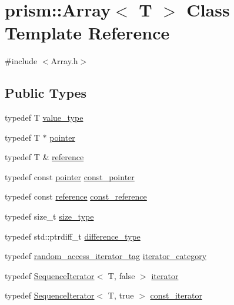 \hypertarget{classprism_1_1_array}{}\section{prism\+:\+:Array$<$ T $>$ Class Template Reference}
\label{classprism_1_1_array}


{\ttfamily \#include $<$Array.\+h$>$}

\subsection*{Public Types}
\begin{DoxyCompactItemize}
\item 
typedef T \hyperlink{classprism_1_1_array_a7b6dc8358fdfe216f4477a361190c9af}{value\+\_\+type}
\item 
typedef T $\ast$ \hyperlink{classprism_1_1_array_a391b8bb39ab945786ca33a0110fc163c}{pointer}
\item 
typedef T \& \hyperlink{classprism_1_1_array_a1ebfd26a4f219fcb24eb7f068704d9aa}{reference}
\item 
typedef const \hyperlink{classprism_1_1_array_a391b8bb39ab945786ca33a0110fc163c}{pointer} \hyperlink{classprism_1_1_array_a42db67aa315835ceb28016cedc9fc300}{const\+\_\+pointer}
\item 
typedef const \hyperlink{classprism_1_1_array_a1ebfd26a4f219fcb24eb7f068704d9aa}{reference} \hyperlink{classprism_1_1_array_a84d3a2c653830c8005e959d99faf0f06}{const\+\_\+reference}
\item 
typedef size\+\_\+t \hyperlink{classprism_1_1_array_a8ceacda8c2a68bf5b54e07a8c4f5f8e3}{size\+\_\+type}
\item 
typedef std\+::ptrdiff\+\_\+t \hyperlink{classprism_1_1_array_abae2669a2cdeba360b37d2f872af9208}{difference\+\_\+type}
\item 
typedef \hyperlink{structprism_1_1random__access__iterator__tag}{random\+\_\+access\+\_\+iterator\+\_\+tag} \hyperlink{classprism_1_1_array_a68b5c70152e822463f8d2a3c0c5bebcb}{iterator\+\_\+category}
\item 
typedef \hyperlink{structprism_1_1_sequence_iterator}{Sequence\+Iterator}$<$ T, false $>$ \hyperlink{classprism_1_1_array_acf99b1f921727cf61cf9d5b66acc66b8}{iterator}
\item 
typedef \hyperlink{structprism_1_1_sequence_iterator}{Sequence\+Iterator}$<$ T, true $>$ \hyperlink{classprism_1_1_array_a1654729fe986281be9c0064999caf3d7}{const\+\_\+iterator}
\end{DoxyCompactItemize}
